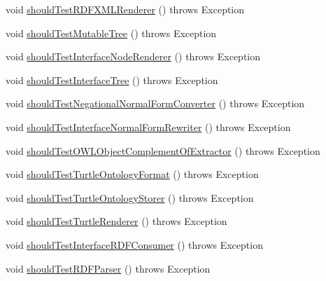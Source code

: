 \begin{DoxyCompactItemize}
void \hyperlink{classorg_1_1semanticweb_1_1owlapi_1_1contract_1_1_contract_smalls_test_ae054a4925aabedddb683b0c4c2c08b61}{should\-Test\-R\-D\-F\-X\-M\-L\-Renderer} ()  throws Exception 
\item 
void \hyperlink{classorg_1_1semanticweb_1_1owlapi_1_1contract_1_1_contract_smalls_test_ac69c979a41424815bdc3c57bb83a642f}{should\-Test\-Mutable\-Tree} ()  throws Exception 
\item 
void \hyperlink{classorg_1_1semanticweb_1_1owlapi_1_1contract_1_1_contract_smalls_test_a54587adef177958d6fcb5f194cde79fa}{should\-Test\-Interface\-Node\-Renderer} ()  throws Exception 
\item 
void \hyperlink{classorg_1_1semanticweb_1_1owlapi_1_1contract_1_1_contract_smalls_test_af82fdea7fd0e1c57bf5df35fae79eb5c}{should\-Test\-Interface\-Tree} ()  throws Exception 
\item 
void \hyperlink{classorg_1_1semanticweb_1_1owlapi_1_1contract_1_1_contract_smalls_test_a85b1ac866f0ed7e49daf088ff26036a6}{should\-Test\-Negational\-Normal\-Form\-Converter} ()  throws Exception 
\item 
void \hyperlink{classorg_1_1semanticweb_1_1owlapi_1_1contract_1_1_contract_smalls_test_ad7c765dd0f5079e48e249dd633f77803}{should\-Test\-Interface\-Normal\-Form\-Rewriter} ()  throws Exception 
\item 
void \hyperlink{classorg_1_1semanticweb_1_1owlapi_1_1contract_1_1_contract_smalls_test_ab17280ee1a5770b379952e466953a08e}{should\-Test\-O\-W\-L\-Object\-Complement\-Of\-Extractor} ()  throws Exception 
\item 
void \hyperlink{classorg_1_1semanticweb_1_1owlapi_1_1contract_1_1_contract_smalls_test_a45da147a0ca468c5e381bba0fed62cce}{should\-Test\-Turtle\-Ontology\-Format} ()  throws Exception 
\item 
void \hyperlink{classorg_1_1semanticweb_1_1owlapi_1_1contract_1_1_contract_smalls_test_a7a7370f63a4dcf5e954c44ea0e328039}{should\-Test\-Turtle\-Ontology\-Storer} ()  throws Exception 
\item 
void \hyperlink{classorg_1_1semanticweb_1_1owlapi_1_1contract_1_1_contract_smalls_test_a49de04b0e37c390c5d514a7618cf93a9}{should\-Test\-Turtle\-Renderer} ()  throws Exception 
\item 
void \hyperlink{classorg_1_1semanticweb_1_1owlapi_1_1contract_1_1_contract_smalls_test_a662eae5e0f9330d2ad28797289b6d9c7}{should\-Test\-Interface\-R\-D\-F\-Consumer} ()  throws Exception 
\item 
void \hyperlink{classorg_1_1semanticweb_1_1owlapi_1_1contract_1_1_contract_smalls_test_a3438da58ce0f6888e1bd94a5dd4b0c35}{should\-Test\-R\-D\-F\-Parser} ()  throws Exception 

\end{DoxyCompactItemize}
